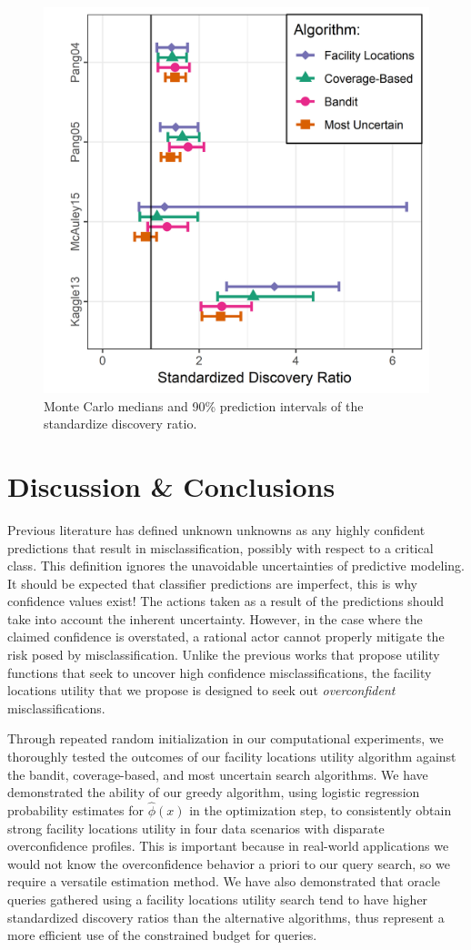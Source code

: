 \documentclass[letterpaper]{article} %
\begin{document}
\begin{figure}[hbtp]
  \includegraphics[width=.49\textwidth]{discoveryRatioPlaceholder.png}
  \caption{Monte Carlo medians and 90\% prediction intervals of the standardize discovery ratio.}
  \label{fig:sdr}
\end{figure}

\section{Discussion \& Conclusions}

Previous literature has defined unknown unknowns as any highly confident predictions that result in misclassification, possibly with respect to a critical class. This definition ignores the unavoidable uncertainties of predictive modeling. It should be expected that classifier predictions are imperfect, this is why confidence values exist! The actions taken as a result of the predictions should take into account the inherent uncertainty. However, in the case where the claimed confidence is overstated, a rational actor cannot properly mitigate the risk posed by misclassification. Unlike the previous works that propose utility functions that seek to uncover high confidence misclassifications, the facility locations utility that we propose is designed to seek out \textit{overconfident} misclassifications. 

Through repeated random initialization in our computational experiments, we thoroughly tested the outcomes of our facility locations utility algorithm against the bandit, coverage-based, and most uncertain search algorithms. We have demonstrated the ability of our greedy algorithm, using logistic regression probability estimates for $\hat{\phi}(x)$ in the optimization step, to consistently obtain strong facility locations utility in four data scenarios with disparate overconfidence profiles. This is important because in real-world applications we would not know the overconfidence behavior a priori to our query search, so we require a versatile estimation method. We have also demonstrated that oracle queries gathered using a facility locations utility search tend to have higher standardized discovery ratios than the alternative algorithms, thus represent a more efficient use of the constrained budget for queries. 
\end{document}
